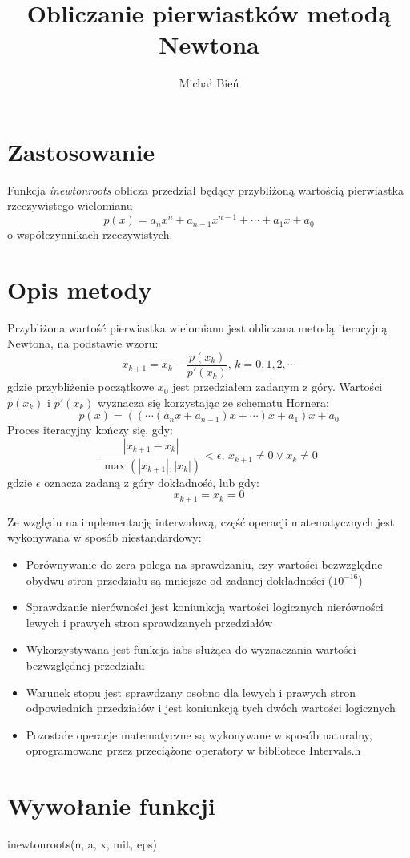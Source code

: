 \documentclass[a4paper]{article}
\author{Michał Bień}
\title{Obliczanie pierwiastków metodą Newtona}
\date{}
\begin{document}
\maketitle
\section{Zastosowanie}
Funkcja \emph{inewtonroots} oblicza przedział będący przybliżoną wartością pierwiastka rzeczywistego wielomianu
$$ p(x) = a_nx^n + a_{n-1}x^{n-1} + \cdots + a_1x + a_0 $$
o współczynnikach rzeczywistych.
\section{Opis metody}
Przybliżona wartość pierwiastka wielomianu jest obliczana metodą iteracyjną Newtona, na podstawie wzoru: 
$$ x_{k+1} = x_k - \frac{p(x_k)}{p'(x_k)} \text{,\ \ \ \ }k = 0, 1, 2, \cdots $$
gdzie przybliżenie początkowe $x_0$ jest przedziałem zadanym z góry. Wartości $p(x_k)$ i $p'(x_k)$ wyznacza się korzystając ze schematu Hornera:
$$ p(x) = ((\cdots(a_nx + a_{n-1})x + \cdots)x + a_1)x + a_0 $$
Proces iteracyjny kończy się, gdy:
$$ \frac{|x_{k+1} - x_k|}{\max(|x_{k+1}|,|x_k|)} < \epsilon\text{,\ \ \ \ } x_{k+1}\neq0 \vee x_k\neq0 $$
gdzie $\epsilon$ oznacza zadaną z góry dokładność, lub gdy:
$$ x_{k+1} = x_k = 0 $$

Ze względu na implementację interwałową, część operacji matematycznych jest wykonywana w sposób niestandardowy:
\begin{itemize}
\item Porównywanie do zera polega na sprawdzaniu, czy wartości bezwzględne obydwu stron przedziału są mniejsze od zadanej dokładności ($10^{-16}$)
\item Sprawdzanie nierówności jest koniunkcją wartości logicznych nierówności lewych i prawych stron sprawdzanych przedziałów
\item Wykorzystywana jest funkcja iabs służąca do wyznaczania wartości bezwzględnej przedziału
\item Warunek stopu jest sprawdzany osobno dla lewych i prawych stron odpowiednich przedziałów i jest koniunkcją tych dwóch wartości logicznych
\item Pozostałe operacje matematyczne są wykonywane w sposób naturalny, oprogramowane przez przeciążone operatory w bibliotece Intervals.h
\end{itemize}

\section{Wywołanie funkcji}
inewtonroots(n, a, x, mit, eps)
\end{document}
